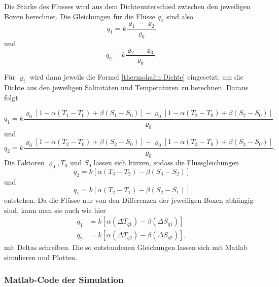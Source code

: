 Die Stärke des Flusses wird aus dem Dichteunterschied zwischen den jeweiligen Boxen berechnet. 
Die Gleichungen für die Flüsse $q_x$ sind also 
\begin{equation}
	q_1 = k\frac{\varrho_1-\varrho_2}{\varrho_0}
\end{equation}
und 
\begin{equation}
q_2 = k\frac{\varrho_2-\varrho_3}{\varrho_0}.
\end{equation}

Für $\varrho_i$ wird dann jeweils die Formel \ref{thermohalin:Dichte} eingesetzt, um die Dichte aus den jeweiligen Salinitäten und Temperaturen zu berechnen. Daraus folgt

\begin{equation}
q_1 = k\frac{\varrho_0[1-\alpha(T_1-T_0)+\beta(S_1-S_0)]-\varrho_0[1-\alpha(T_2-T_0)+\beta(S_2-S_0)]}{\varrho_0}
\end{equation}
und 
\begin{equation}
q_2 = k\frac{\varrho_0[1-\alpha(T_2-T_0)+\beta(S_2-S_0)]-\varrho_0[1-\alpha(T_3-T_0)+\beta(S_3-S_0)]}{\varrho_0}.
\end{equation}
Die Faktoren $\varrho_0, T_0$ und $S_0$ lassen sich kürzen, sodass die Flussgleichungen 
\begin{equation}
 q_2 = k[\alpha(T_3-T_2)-\beta(S_3-S_2)]
\end{equation}
und 
\begin{equation}
 q_1 = k[\alpha(T_2-T_1)-\beta(S_2-S_1)] 
\end{equation}
entstehen.
Da die Flüsse nur von den Differenzen der jeweiligen Boxen abhängig sind, kann man sie auch wie hier
\begin{equation}
\begin{aligned}
q_1 &= k[\alpha(\Delta T_{q1})-\beta(\Delta S_{q1})] 
\\
q_2 &= k[\alpha(\Delta T_{q2})-\beta(\Delta S_{q2})],
\end{aligned}
\end{equation}
mit Deltas schreiben.
Die so entstandenen Gleichungen lassen sich mit Matlab simulieren und Plotten.


\subsubsection{Matlab-Code der Simulation}

